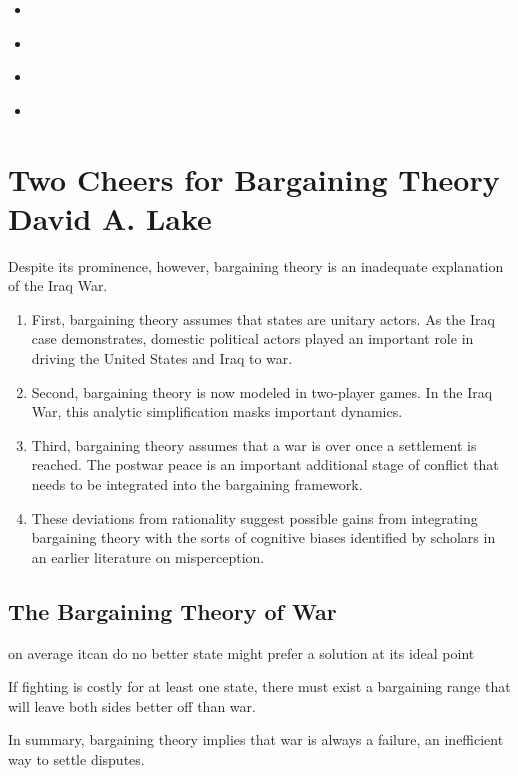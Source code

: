 
\begin{itemize}
    \item [***] \textcite{lakeTwoCheersBargaining2010}
    \item \textcite{Fearon_1995}
    \item \textcite{sechserCrisisBargainingNuclear2013}
    \item \textcite{powellInefficientUsePower2004}
\end{itemize}

\section{Two Cheers for Bargaining Theory David A. Lake}
Despite its prominence, however, bargaining theory is an inadequate explanation of the Iraq War.

\begin{enumerate}
    \item First, bargaining theory assumes that states are unitary actors. As the Iraq case demonstrates, domestic political actors played an important role in driving the United States and Iraq to war.
    \item Second, bargaining theory is now modeled in two-player games. In the Iraq War, this analytic simplification masks important dynamics.
    \item Third, bargaining theory assumes that a war is over once a settlement is reached. The postwar peace is an important additional stage of conflict that needs to be integrated into the bargaining framework.
    \item These deviations from rationality suggest possible gains from integrating bargaining theory with the sorts of cognitive biases identified by scholars in an earlier literature on misperception.
\end{enumerate}

\subsection{The Bargaining Theory of War}
on average itcan do no better state might prefer a solution at its ideal point

If fighting is costly for at least one state, there must exist a bargaining range that will leave both sides better off than war.

In summary, bargaining theory implies that war is always a failure, an inefficient way to settle disputes.


